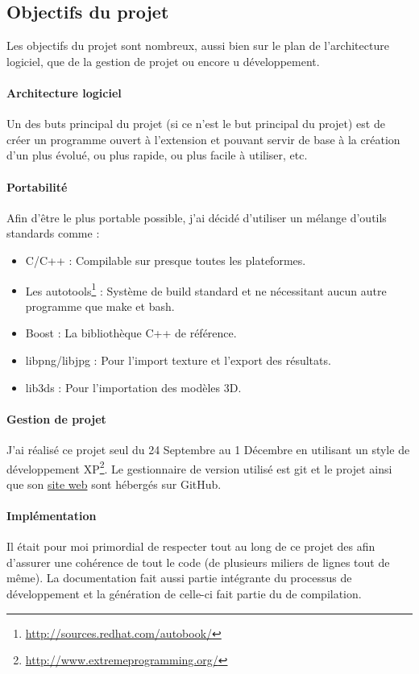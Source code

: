 \subsection{Objectifs du projet}
Les objectifs du projet sont nombreux, aussi bien sur le plan de
l'architecture logiciel, que de la gestion de projet ou encore u
développement.

\paragraph{Architecture logiciel}
Un des buts principal du projet (si ce n'est le but principal du projet) est
de créer un programme ouvert à l'extension et pouvant servir de base à la
création d'un \raytracing plus évolué, ou plus rapide, ou plus facile à
utiliser, etc.

\paragraph{Portabilité}
Afin d'être le plus portable possible, j'ai décidé d'utiliser un mélange
d'outils standards comme :
\begin{itemize}
  \item C/C++ : Compilable sur presque toutes les plateformes.
  \item Les autotools\footnote{\url{http://sources.redhat.com/autobook/}} :
  Système de build standard et ne nécessitant aucun autre programme que make
  et bash.
  \item Boost : La bibliothèque C++ de référence.
  \item libpng/libjpg : Pour l'import texture et l'export des résultats.
  \item lib3ds : Pour l'importation des modèles 3D.
\end{itemize}

\paragraph{Gestion de projet}
J'ai réalisé ce projet seul du 24 Septembre au 1 Décembre en utilisant un
style de développement \gls{XP}\footnote{\url{http://www.extremeprogramming.org/}}.
Le gestionnaire de version utilisé est git et le projet ainsi que son
\href{http://digitalguru.github.com/LyonRayTracer}{site web} sont hébergés sur
GitHub.

\paragraph{Implémentation}
Il était pour moi primordial de respecter tout au long de ce projet des
 afin d'assurer une cohérence de tout le code (de plusieurs
miliers de lignes tout de même). La documentation fait aussi partie intégrante
du processus de développement et la génération de celle-ci fait partie du
 de compilation.


